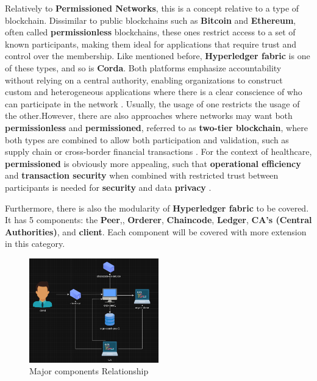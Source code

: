 Relatively to \textbf{Permissioned Networks}, this is a concept relative to a type of blockchain. Dissimilar to public blockchains such as \textbf{Bitcoin} and \textbf{Ethereum}, often called \textbf{permissionless} blockchains, these ones restrict access to a set of known participants, making them ideal for applications that require trust and control over the membership. Like mentioned before, \textbf{Hyperledger fabric} is one of these types, and so is \textbf{Corda}. Both platforms emphasize accountability without relying on a central authority, enabling organizations to construct custom and heterogeneous applications where there is a clear conscience of who can participate in the network \cite{permissioned-blockchains}. Usually, the usage of one restricts the usage of the other.However, there are also approaches where networks may want both \textbf{permissionless} and \textbf{permissioned}, referred to as \textbf{two-tier blockchain}, where both types are combined to allow both participation and validation, such as supply chain or cross-border financial transactions \cite{two-tier-permission-blockchains}. For the context of healthcare, \textbf{permissioned} is obviously more appealing, such that \textbf{operational efficiency} and \textbf{transaction security} when combined with restricted trust between participants is needed for \textbf{security} and data \textbf{privacy} \cite{permissioned-vs-permissionless-tradeoffs}.

Furthermore, there is also the modularity of \textbf{Hyperledger fabric} to be covered. It has 5 components: the \textbf{Peer},, \textbf{Orderer}, \textbf{Chaincode}, \textbf{Ledger}, \textbf{CA's (Central Authorities)}, and \textbf{client}. Each component will be covered with more extension in this category.

\begin{figure}[H]
    \centering
    \includegraphics[width=0.5\textwidth]{assets/tools/hyperledger/hlf-minimal-setup.png} %
    \caption{Major components Relationship}
    \label{fig:sample-image} 
\end{figure}

